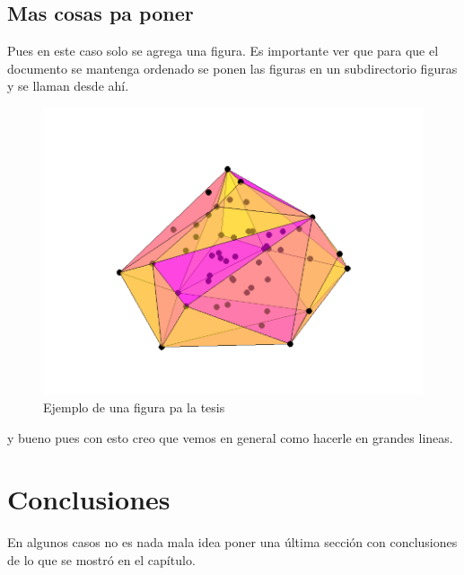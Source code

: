 \subsection{Mas cosas pa poner}

Pues en este caso solo se agrega una figura. Es importante ver que
para que el documento se mantenga ordenado se ponen las figuras en
un subdirectorio figuras y se llaman desde ahí.

\begin{figure}
	\centering
	\includegraphics[width=.7\textwidth]{tesislcc/tesela.pdf}
    \caption{Ejemplo de una figura pa la tesis}
    \label{fig:teselacion}
\end{figure}

y bueno pues con esto creo que vemos en general como hacerle en
grandes lineas.

\section{Conclusiones}
En algunos casos no es nada mala idea poner una última sección con
conclusiones de lo que se mostró en el capítulo. 
